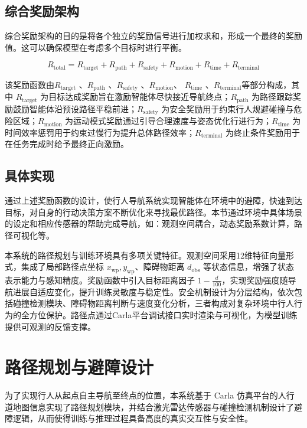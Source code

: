 \subsection{综合奖励架构}
综合奖励架构的目的是将各个独立的奖励信号进行加权求和，形成一个最终的奖励值。这可以确保模型在考虑多个目标时进行平衡。
	
\begin{equation}
R_{\text{total}} = R_{\text{target}} + R_{\text{path}} + R_{\text{safety}} + R_{\text{motion}} + R_{\text{time}} + R_{\text{terminal}}
\end{equation}

该奖励函数由\( R_{\text{target}} \) 、\( R_{\text{path}} \) 、\( R_{\text{safety}} \) 、\( R_{\text{motion}} \)、 \( R_{\text{time}} \) 、\( R_{\text{terminal}} \)等部分构成，其中 \( R_{\text{target}} \) 为目标达成奖励旨在激励智能体尽快接近导航终点；\( R_{\text{path}} \) 为路径跟踪奖励鼓励智能体沿预设路径平稳前进；\( R_{\text{safety}} \) 为安全奖励用于约束行人规避碰撞与危险区域；\( R_{\text{motion}} \) 为运动模式奖励通过引导合理速度与姿态优化行进行为；\( R_{\text{time}} \) 为时间效率惩罚用于约束过慢行为提升总体路径效率；\( R_{\text{terminal}} \) 为终止条件奖励用于在任务完成时给予最终正向激励。

\subsection{具体实现}
通过上述奖励函数的设计，使行人导航系统实现智能体在环境中的避障，快速到达目标，对自身的行动决策方案不断优化来寻找最优路径。本节通过环境中具体场景的设定和相应传感器的帮助完成导航，如：观测空间耦合，动态奖励系数计算，路径可视化等。
	
本系统的路径规划与训练环境具有多项关键特征。观测空间采用12维特征向量形式，集成了局部路径点坐标 \(x_{\text{wp}}, y_{\text{wp}}\)、障碍物距离 \(d_{\text{obs}}\) 等状态信息，增强了状态表示能力与感知精度。奖励函数中引入目标距离因子 \(1 - \frac{d}{100}\)，实现奖励强度随导航进展自适应变化，提升训练灵敏度与稳定性。安全机制设计为分层结构，依次包括碰撞检测模块、障碍物距离判断与速度变化分析，三者构成对复杂环境中行人行为的全方位保护。路径点通过Carla平台调试接口实时渲染与可视化，为模型训练提供可观测的反馈支撑。
	
\section{路径规划与避障设计}
	
为了实现行人从起点自主导航至终点的位置，本系统基于 Carla 仿真平台的人行道地图信息实现了路径规划模块，并结合激光雷达传感器与碰撞检测机制设计了避障逻辑，从而使得训练与推理过程具备高度的真实交互性与安全性。
	
